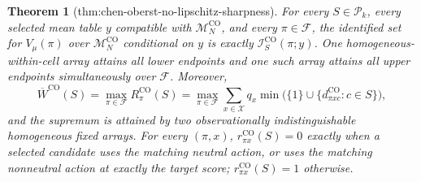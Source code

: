 \documentclass{article}
\newtheorem{theorem}{Theorem}
\begin{document}
\begin{theorem}[thm:chen-oberst-no-lipschitz-sharpness]\label{thm:chen-oberst-no-lipschitz-sharpness}
For every \(S\in\mathcal P_k\), every selected mean table \(y\) compatible with \(\mathcal M_N^{\mathrm{CO}}\), and every \(\pi\in\mathcal F\), the identified set for \(V_\mu(\pi)\) over \(\mathcal M_N^{\mathrm{CO}}\) conditional on \(y\) is exactly \(\mathcal I^{\mathrm{CO}}_S(\pi;y)\).  One homogeneous-within-cell array attains all lower endpoints and one such array attains all upper endpoints simultaneously over \(\mathcal F\).  Moreover,
\[
\overline W^{\mathrm{CO}}(S)
=\max_{\pi\in\mathcal F}R^{\mathrm{CO}}_\pi(S)
=\max_{\pi\in\mathcal F}\sum_{x\in\mathcal X}q_x
\min\bigl(\{1\}\cup\{d^{\mathrm{CO}}_{\pi xc}:c\in S\}\bigr),
\]
and the supremum is attained by two observationally indistinguishable homogeneous fixed arrays.  For every \((\pi,x)\), \(r^{\mathrm{CO}}_{\pi x}(S)=0\) exactly when a selected candidate uses the matching neutral action, or uses the matching nonneutral action at exactly the target score; \(r^{\mathrm{CO}}_{\pi x}(S)=1\) otherwise.
\end{theorem}
\end{document}
